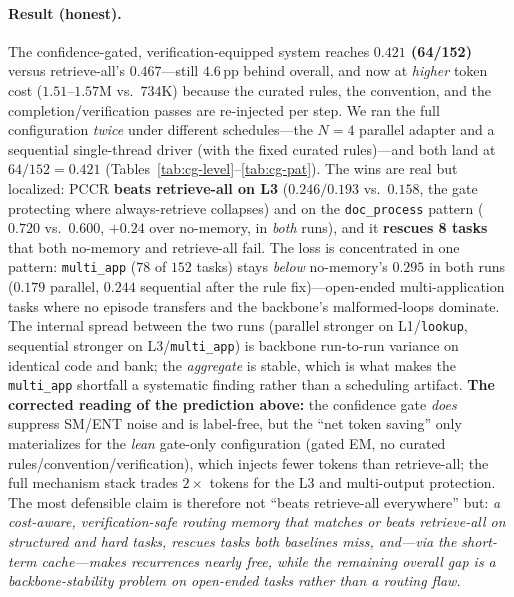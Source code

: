 \documentclass[10pt,twocolumn]{article}
\newcommand{\code}[1]{\texttt{\small #1}}
\begin{document}
\paragraph{Result (honest).} The confidence-gated, verification-equipped system reaches
\textbf{$0.421$ (64/152)} versus retrieve-all's $0.467$---still $4.6$\,pp behind overall, and now at
\emph{higher} token cost ($1.51$--$1.57$M vs.\ $734$K) because the curated rules, the convention, and the
completion/verification passes are re-injected per step. We ran the full configuration \emph{twice}
under different schedules---the $N{=}4$ parallel adapter and a sequential single-thread driver (with
the fixed curated rules)---and both land at $64/152=0.421$ (Tables~\ref{tab:cg-level}--\ref{tab:cg-pat}).
The wins are real but localized: PCCR \textbf{beats retrieve-all on L3} ($0.246/0.193$ vs.\ $0.158$,
the gate protecting where always-retrieve collapses) and on the \code{doc\_process} pattern ($0.720$
vs.\ $0.600$, $+0.24$ over no-memory, in \emph{both} runs), and it \textbf{rescues 8 tasks} that both
no-memory and retrieve-all fail. The loss is concentrated in one pattern: \code{multi\_app} ($78$ of
$152$ tasks) stays \emph{below} no-memory's $0.295$ in both runs ($0.179$ parallel, $0.244$ sequential
after the rule fix)---open-ended multi-application tasks where no episode transfers and the backbone's
malformed-loops dominate. The internal spread between the two runs (parallel stronger on L1/\code{lookup},
sequential stronger on L3/\code{multi\_app}) is backbone run-to-run variance on identical code and
bank; the \emph{aggregate} is stable, which is what makes the \code{multi\_app} shortfall a systematic
finding rather than a scheduling artifact. \textbf{The corrected reading of the prediction above:} the confidence gate \emph{does}
suppress SM/ENT noise and is label-free, but the ``net token saving'' only materializes for the
\emph{lean} gate-only configuration (gated EM, no curated rules/convention/verification), which injects
fewer tokens than retrieve-all; the full mechanism stack trades $2\times$ tokens for the L3 and
multi-output protection. The most defensible claim is therefore not ``beats retrieve-all everywhere''
but: \emph{a cost-aware, verification-safe routing memory that matches or beats retrieve-all on
structured and hard tasks, rescues tasks both baselines miss, and---via the short-term cache---makes
recurrences nearly free, while the remaining overall gap is a backbone-stability problem on open-ended
tasks rather than a routing flaw.}
\end{document}
